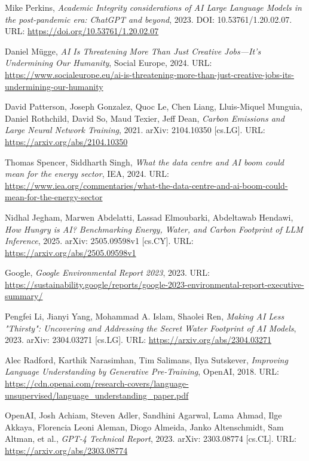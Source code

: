 \begin{thebibliography}{9}

	Mike Perkins,
	\textit{Academic Integrity considerations of AI Large Language Models in the post-pandemic era: ChatGPT and beyond},
	2023. DOI: 10.53761/1.20.02.07. URL: \url{https://doi.org/10.53761/1.20.02.07}

	Daniel Mügge,
	\textit{AI Is Threatening More Than Just Creative Jobs—It's Undermining Our Humanity},
	Social Europe, 2024. URL: \url{https://www.socialeurope.eu/ai-is-threatening-more-than-just-creative-jobs-its-undermining-our-humanity}

	David Patterson, Joseph Gonzalez, Quoc Le, Chen Liang, Lluis-Miquel Munguia, Daniel Rothchild, David So, Maud Texier, Jeff Dean,
	\textit{Carbon Emissions and Large Neural Network Training},
	2021. arXiv: 2104.10350 [cs.LG]. URL: \url{https://arxiv.org/abs/2104.10350}

	Thomas Spencer, Siddharth Singh,
	\textit{What the data centre and AI boom could mean for the energy sector},
	IEA, 2024. URL: \url{https://www.iea.org/commentaries/what-the-data-centre-and-ai-boom-could-mean-for-the-energy-sector}

	Nidhal Jegham, Marwen Abdelatti, Lassad Elmoubarki, Abdeltawab Hendawi,
	\textit{How Hungry is AI? Benchmarking Energy, Water, and Carbon Footprint of LLM Inference},
	2025. arXiv: 2505.09598v1 [cs.CY]. URL: \url{https://arxiv.org/abs/2505.09598v1}

	Google,
	\textit{Google Environmental Report 2023}, 2023. URL:
	\url{https://sustainability.google/reports/google-2023-environmental-report-executive-summary/}

	Pengfei Li, Jianyi Yang, Mohammad A. Islam, Shaolei Ren,
	\textit{Making AI Less "Thirsty": Uncovering and Addressing the Secret Water Footprint of AI Models},
	2023. arXiv: 2304.03271 [cs.LG]. URL: \url{https://arxiv.org/abs/2304.03271}

	Alec Radford, Karthik Narasimhan, Tim Salimans, Ilya Sutskever,
	\textit{Improving Language Understanding by Generative Pre-Training}, OpenAI, 2018. URL:
	\url{https://cdn.openai.com/research-covers/language-unsupervised/language_understanding_paper.pdf}

	OpenAI, Josh Achiam, Steven Adler, Sandhini Agarwal, Lama Ahmad, Ilge Akkaya, Florencia Leoni Aleman, Diogo Almeida, Janko Altenschmidt, Sam Altman, et al.,
	\textit{GPT-4 Technical Report},
	2023. arXiv: 2303.08774 [cs.CL]. URL: \url{https://arxiv.org/abs/2303.08774}


\end{thebibliography}
